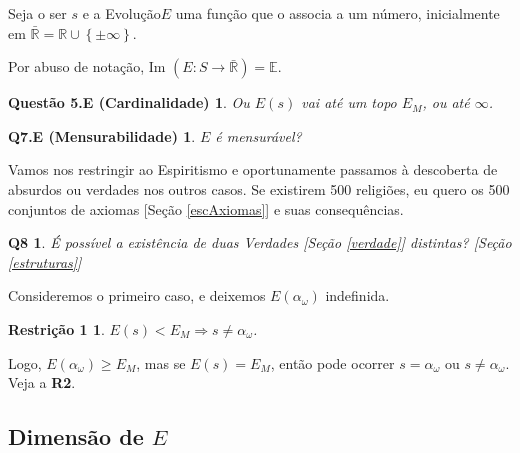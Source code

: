 \documentclass[12pt,a4paper]{article}
\begin{document}
			Seja o ser $ s $ e a Evolu\c{c}\~ao\footnotemark[1] $ E $ uma fun\c{c}\~ao que o associa a um n\'umero, inicialmente em $ \mathbb{\bar{R}} = \mathbb{R} \cup \left\{\pm \infty\right\} $.


			Por abuso de nota\c{c}\~ao, Im $(E: S \rightarrow \mathbb{\bar{R}}) = \mathbb{E} $.

			\newtheorem{Q5.E}{Quest\~ao 5.E (Cardinalidade)}
			\begin{Q5.E} Ou $E(s)$ vai at\'e um topo $ E_M $, ou at\'e $ \infty $.
			\end{Q5.E}

			\newtheorem{Q7.E}{Q7.E (Mensurabilidade)}
			\begin{Q7.E} $E$ \'e mensur\'avel?
			\end{Q7.E}

			Vamos nos restringir ao Espiritismo e oportunamente passamos \`a descoberta de absurdos ou verdades nos outros casos. Se existirem 500 religi\~oes, eu quero os 500 conjuntos de axiomas [Se\c{c}\~ao \ref{escAxiomas}] e suas consequ\^encias.

			\newtheorem{Q8}{Q8}
			\begin{Q8} \'E poss\'ivel a exist\^encia de duas Verdades [Se\c{c}\~ao \ref{verdade}] distintas? [Se\c{c}\~ao \ref{estruturas}]
			\end{Q8}

			Consideremos o primeiro caso\footnotemark[2], e deixemos $E(\alpha_\omega)$ indefinida.


			\newtheorem{R1}{Restri\c{c}\~ao 1}
			\begin{R1} $ E(s) < E_M \Rightarrow s \neq \alpha_\omega $.
			\end{R1}

			Logo, $ E(\alpha_\omega) \ge E_M $, mas se $ E(s) = E_M $, ent\~ao pode ocorrer $s = \alpha_\omega $ ou $ s \neq \alpha_\omega $. Veja a \textbf{R2}.

		\subsection{Dimens\~ao de $E$}\label{amor} %
			\begin{flushright}
			\end{flushright}
\end{document}
